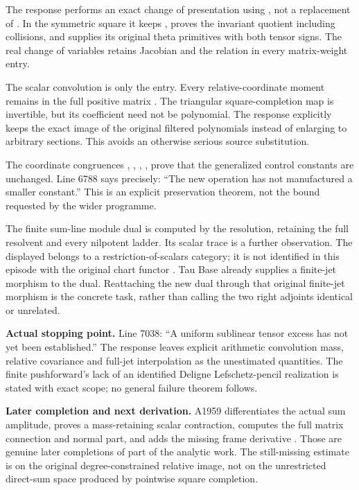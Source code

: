 \documentclass[10pt,a4paper,oneside]{report}
\begin{document}
The response performs an exact change of presentation using
\protect{}, not a replacement of \protect{}. In the
symmetric square it keeps \protect{}, proves the
invariant quotient \protect{} including collisions,
and supplies its original theta primitives with both tensor signs. The
real change of variables retains Jacobian \protect{} and the
relation \protect{} in every matrix-weight entry.

The scalar convolution is only the \protect{} entry. Every
relative-coordinate moment remains in the full positive matrix
\protect{}. The triangular square-completion map is
invertible, but its coefficient \protect{} need not be
polynomial. The response explicitly keeps the exact image of the
original filtered polynomials instead of enlarging to arbitrary
sections. This avoids an otherwise serious source substitution.

The coordinate congruences \protect{},
\protect{}, \protect{},
\protect{}, \protect{} prove that the generalized
control constants are unchanged. Line 6788 says precisely: ``The new
operation has not manufactured a smaller constant.'' This is an explicit
preservation theorem, not the bound requested by the wider programme.

The finite sum-line module dual is computed by the \protect{}
resolution, retaining the full resolvent and every nilpotent ladder. Its
scalar trace is a further observation. The displayed
\protect{} belongs to a restriction-of-scalars
category; it is not identified in this episode with the original chart
functor \protect{}. Tau Base already supplies a finite-jet
morphism to the \protect{} dual. Reattaching the new dual
through that original finite-jet morphism is the concrete task, rather
than calling the two right adjoints identical or unrelated.

\textbf{Actual stopping point.} Line 7038: ``A uniform sublinear tensor
excess has not yet been established.'' The response leaves explicit
arithmetic convolution mass, relative covariance and full-jet
interpolation as the unestimated quantities. The finite pushforward's
lack of an identified Deligne Lefschetz-pencil realization is stated
with exact scope; no general failure theorem follows.

\textbf{Later completion and next derivation.} A1959 differentiates the
actual sum amplitude, proves a mass-retaining scalar contraction,
computes the full matrix connection and normal part, and adds the
missing frame derivative \protect{}. Those are genuine
later completions of part of the analytic work. The still-missing
estimate is on the original degree-constrained relative image, not on
the unrestricted direct-sum space produced by pointwise square
completion.
\end{document}
